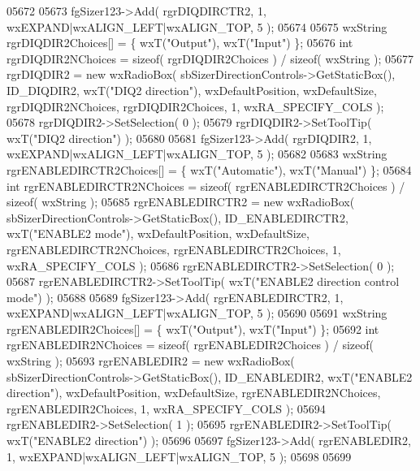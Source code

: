\begin{DoxyCode}
05672     
05673     fgSizer123->Add( rgrDIQDIRCTR2, 1, wxEXPAND|wxALIGN\_LEFT|wxALIGN\_TOP, 5 );
05674     
05675     wxString rgrDIQDIR2Choices[] = \{ wxT(\textcolor{stringliteral}{"Output"}), wxT(\textcolor{stringliteral}{"Input"}) \};
05676     \textcolor{keywordtype}{int} rgrDIQDIR2NChoices = \textcolor{keyword}{sizeof}( rgrDIQDIR2Choices ) / \textcolor{keyword}{sizeof}( wxString );
05677     rgrDIQDIR2 = \textcolor{keyword}{new} wxRadioBox( sbSizerDirectionControls->GetStaticBox(), 
      ID_DIQDIR2, wxT(\textcolor{stringliteral}{"DIQ2 direction"}), wxDefaultPosition, wxDefaultSize, rgrDIQDIR2NChoices, rgrDIQDIR2Choices,
       1, wxRA\_SPECIFY\_COLS );
05678     rgrDIQDIR2->SetSelection( 0 );
05679     rgrDIQDIR2->SetToolTip( wxT(\textcolor{stringliteral}{"DIQ2 direction"}) );
05680     
05681     fgSizer123->Add( rgrDIQDIR2, 1, wxEXPAND|wxALIGN\_LEFT|wxALIGN\_TOP, 5 );
05682     
05683     wxString rgrENABLEDIRCTR2Choices[] = \{ wxT(\textcolor{stringliteral}{"Automatic"}), wxT(\textcolor{stringliteral}{"Manual"}) \};
05684     \textcolor{keywordtype}{int} rgrENABLEDIRCTR2NChoices = \textcolor{keyword}{sizeof}( rgrENABLEDIRCTR2Choices ) / \textcolor{keyword}{sizeof}( wxString );
05685     rgrENABLEDIRCTR2 = \textcolor{keyword}{new} wxRadioBox( sbSizerDirectionControls->GetStaticBox(), 
      ID_ENABLEDIRCTR2, wxT(\textcolor{stringliteral}{"ENABLE2 mode"}), wxDefaultPosition, wxDefaultSize, rgrENABLEDIRCTR2NChoices, 
      rgrENABLEDIRCTR2Choices, 1, wxRA\_SPECIFY\_COLS );
05686     rgrENABLEDIRCTR2->SetSelection( 0 );
05687     rgrENABLEDIRCTR2->SetToolTip( wxT(\textcolor{stringliteral}{"ENABLE2 direction control mode"}) );
05688     
05689     fgSizer123->Add( rgrENABLEDIRCTR2, 1, wxEXPAND|wxALIGN\_LEFT|wxALIGN\_TOP, 5 );
05690     
05691     wxString rgrENABLEDIR2Choices[] = \{ wxT(\textcolor{stringliteral}{"Output"}), wxT(\textcolor{stringliteral}{"Input"}) \};
05692     \textcolor{keywordtype}{int} rgrENABLEDIR2NChoices = \textcolor{keyword}{sizeof}( rgrENABLEDIR2Choices ) / \textcolor{keyword}{sizeof}( wxString );
05693     rgrENABLEDIR2 = \textcolor{keyword}{new} wxRadioBox( sbSizerDirectionControls->GetStaticBox(), 
      ID_ENABLEDIR2, wxT(\textcolor{stringliteral}{"ENABLE2 direction"}), wxDefaultPosition, wxDefaultSize, rgrENABLEDIR2NChoices, 
      rgrENABLEDIR2Choices, 1, wxRA\_SPECIFY\_COLS );
05694     rgrENABLEDIR2->SetSelection( 1 );
05695     rgrENABLEDIR2->SetToolTip( wxT(\textcolor{stringliteral}{"ENABLE2 direction"}) );
05696     
05697     fgSizer123->Add( rgrENABLEDIR2, 1, wxEXPAND|wxALIGN\_LEFT|wxALIGN\_TOP, 5 );
05698     
05699     

\end{DoxyCode}
